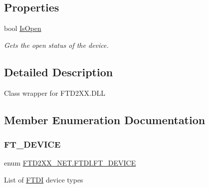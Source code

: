 \subsection*{Properties}
\begin{DoxyCompactItemize}
\item 
bool \mbox{\hyperlink{class_f_t_d2_x_x___n_e_t_1_1_f_t_d_i_ad6918818625bceacf7623d2d792b80ec}{Is\+Open}}
\begin{DoxyCompactList}\small\item\em Gets the open status of the device. \end{DoxyCompactList}\end{DoxyCompactItemize}


\subsection{Detailed Description}
Class wrapper for F\+T\+D2\+X\+X.\+D\+LL 



\subsection{Member Enumeration Documentation}
\mbox{\label{class_f_t_d2_x_x___n_e_t_1_1_f_t_d_i_a7f69db13362f65d251d6b16e3eec585f}} 
\subsubsection{\texorpdfstring{FT\_DEVICE}{FT\_DEVICE}}
{\footnotesize\ttfamily enum \mbox{\hyperlink{class_f_t_d2_x_x___n_e_t_1_1_f_t_d_i_a7f69db13362f65d251d6b16e3eec585f}{F\+T\+D2\+X\+X\+\_\+\+N\+E\+T.\+F\+T\+D\+I.\+F\+T\+\_\+\+D\+E\+V\+I\+CE}}\hspace{0.3cm}{\ttfamily [strong]}}



List of \mbox{\hyperlink{class_f_t_d2_x_x___n_e_t_1_1_f_t_d_i}{F\+T\+DI}} device types 

